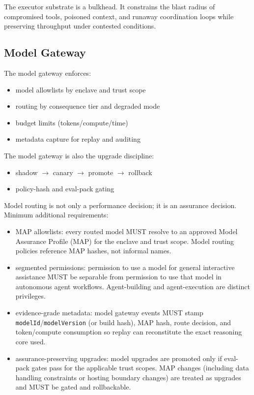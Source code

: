 \documentclass[11pt]{article}
\begin{document}
The executor substrate is a bulkhead. It constrains the blast radius of
compromised tools, poisoned context, and runaway coordination loops
while preserving throughput under contested conditions.

\hypertarget{model-gateway}{%
\subsection{Model Gateway}\label{model-gateway}}

The model gateway enforces:

\begin{itemize}
\tightlist
\item
  model allowlists by enclave and trust scope
\item
  routing by consequence tier and degraded mode
\item
  budget limits (tokens/compute/time)
\item
  metadata capture for replay and auditing
\end{itemize}

The model gateway is also the upgrade discipline:

\begin{itemize}
\tightlist
\item
  shadow \ensuremath{\rightarrow} canary \ensuremath{\rightarrow} promote \ensuremath{\rightarrow} rollback
\item
  policy-hash and eval-pack gating
\end{itemize}

Model routing is not only a performance decision; it is an assurance
decision. Minimum additional requirements:

\begin{itemize}
\tightlist
\item
  MAP allowlists: every routed model MUST resolve to an approved Model
  Assurance Profile (MAP) for the enclave and trust scope. Model routing
  policies reference MAP hashes, not informal names.
\item
  segmented permissions: permission to use a model for general
  interactive assistance MUST be separable from permission to use that
  model in autonomous agent workflows. Agent-building and
  agent-execution are distinct privileges.
\item
  evidence-grade metadata: model gateway events MUST stamp
  \texttt{modelId}/\texttt{modelVersion} (or build hash), MAP hash,
  route decision, and token/compute consumption so replay can
  reconstitute the exact reasoning core used.
\item
  assurance-preserving upgrades: model upgrades are promoted only if
  eval-pack gates pass for the applicable trust scopes. MAP changes
  (including data handling constraints or hosting boundary changes) are
  treated as upgrades and MUST be gated and rollbackable.
\end{itemize}
\end{document}
